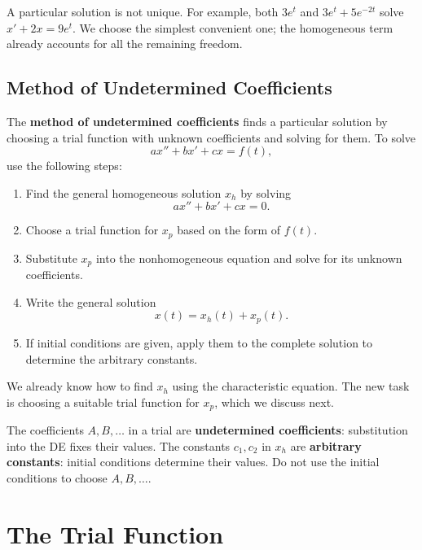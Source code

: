 \documentclass[10pt,letterpaper]{article}
\begin{document}
A particular solution is not unique. For example, both $3e^t$ and
$3e^t+5e^{-2t}$ solve $x'+2x=9e^t$. We choose the simplest convenient
one; the homogeneous term already accounts for all the remaining freedom.

\subsection{Method of Undetermined Coefficients}

The \textbf{method of undetermined coefficients} finds a
particular solution by choosing a trial function with unknown
coefficients and solving for them. To solve
\[
ax''+bx'+cx=f(t),
\]
use the following steps:
\begin{enumerate}
    \item Find the general homogeneous solution $x_h$ by solving
    \[
    ax''+bx'+cx=0.
    \]

    \item Choose a trial function for $x_p$ based on the form
    of $f(t)$. 

    \item Substitute $x_p$ into the nonhomogeneous equation
    and solve for its unknown coefficients.

    \item Write the general solution
    \[
    x(t)=x_h(t)+x_p(t).
    \]

    \item If initial conditions are given, apply them to the
    complete solution to determine the arbitrary constants.
\end{enumerate}

We already know how to find $x_h$ using the characteristic
equation. The new task is choosing a suitable trial function
for $x_p$, which we discuss next. 




The coefficients $A,B,\ldots$ in a trial are \textbf{undetermined coefficients}:
substitution into the DE fixes their values. The constants $c_1,c_2$ in $x_h$
are \textbf{arbitrary constants}: initial conditions determine their values.
Do not use the initial conditions to choose $A,B,\ldots$.

\section{The Trial Function}
\end{document}
